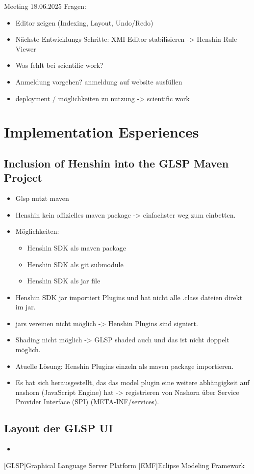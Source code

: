 \documentclass[conference,onecolumn]{IEEEtran}
\begin{document}
  Meeting 18.06.2025 Fragen:
  \begin{itemize}
    \item Editor zeigen (Indexing, Layout, Undo/Redo)
    \item Nächste Entwicklungs Schritte: XMI Editor stabilisieren -> Henshin Rule Viewer
    \item Was fehlt bei scientific work?
    \item Anmeldung vorgehen? anmeldung auf website ausfüllen
    \item deployment / möglichkeiten zu nutzung -> scientific work
  \end{itemize}












  \section{Implementation Esperiences}

  \subsection{Inclusion of Henshin into the GLSP Maven Project}

  \begin{itemize}
    \item   Glsp nutzt maven
    \item Henshin kein offizielles maven package -> einfachster weg zum einbetten.
    \item Möglichkeiten:
      \begin{itemize}
        \item Henshin SDK als maven package
        \item Henshin SDK als git submodule
        \item Henshin SDK als jar file
      \end{itemize}
    \item Henshin SDK jar importiert Plugins und hat nicht alle .class dateien direkt im jar.
    \item jars vereinen nicht möglich -> Henshin Plugins sind signiert.
    \item Shading nicht möglich -> GLSP shaded auch und das ist nicht doppelt möglich.
    \item Atuelle Lösung: Henshin Plugins einzeln als maven package importieren.
    \item Es hat sich herausgestellt, das das model plugin eine weitere abhängigkeit auf nashorn (JavaScript Engine) hat -> registrieren von Nashorn über Service Provider Interface (SPI) (META-INF/services).
  \end{itemize}

  \subsection{Layout der GLSP UI}
  \begin{itemize}
    \item 
  \end{itemize}



  \printbibliography

  \begin{acronym}
    [GLSP]{Graphical Language Server Platform}
    [EMF]{Eclipse Modeling Framework}

  \end{acronym}
\end{document}
